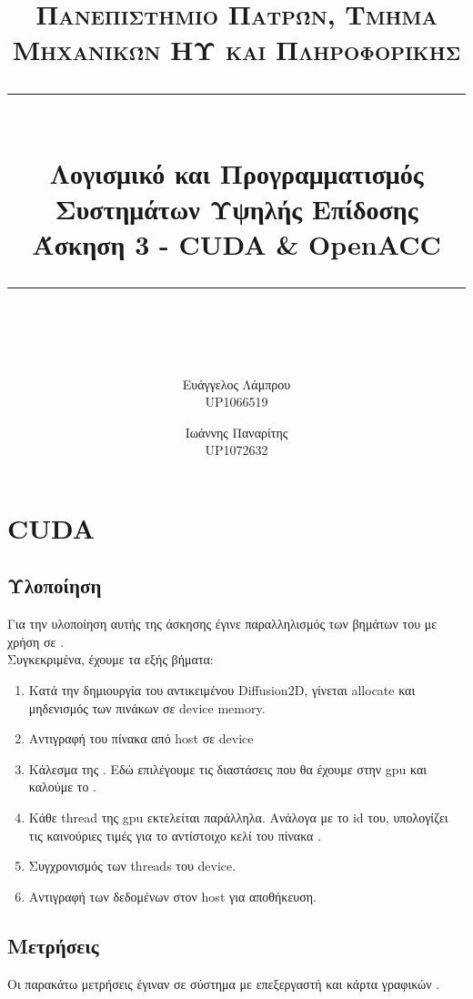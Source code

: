 \documentclass[11pt]{scrartcl} %
\title{	
	\normalfont\normalsize
	\textsc{Πανεπιστήμιο Πατρών, Τμήμα Μηχανικών ΗΥ και Πληροφορικής}\\ %
	\vspace{25pt} %
	\rule{\linewidth}{0.5pt}\\ %
	\vspace{20pt} %
    {\LARGE Λογισμικό και Προγραμματισμός Συστημάτων Υψηλής Επίδοσης\\ Άσκηση 3 - CUDA \& OpenACC}\\ %
	\vspace{12pt} %
	\rule{\linewidth}{2pt}\\ %
	\vspace{12pt} %
}
\author{Ευάγγελος Λάμπρου \\UP1066519 \and Ιωάννης Παναρίτης \\UP1072632} %
\date{} %
\begin{document}
\maketitle 

\section{CUDA}

\subsection{Υλοποίηση}

Για την υλοποίηση αυτής της άσκησης έγινε παραλληλισμός των βημάτων του  με χρήση  σε .\\
Συγκεκριμένα, έχουμε τα εξής βήματα:

\begin{enumerate}
    \item Κατά την δημιουργία του αντικειμένου Diffusion2D, γίνεται allocate και μηδενισμός των πινάκων σε device memory.
    \item Αντιγραφή του πίνακα  από host σε device
    \item Κάλεσμα της . Εδώ επιλέγουμε τις διαστάσεις που θα έχουμε στην gpu και καλούμε το .
    \item Κάθε thread της gpu εκτελείται παράλληλα. Ανάλογα με το id του, υπολογίζει τις καινούριες τιμές για το αντίστοιχο κελί του πίνακα .
    \item Συγχρονισμός των threads του device.
    \item Αντιγραφή των δεδομένων στον host για αποθήκευση.
\end{enumerate}

\subsection{Μετρήσεις}

Οι παρακάτω μετρήσεις έγιναν σε σύστημα με επεξεργαστή  και κάρτα γραφικών .
\end{document}
